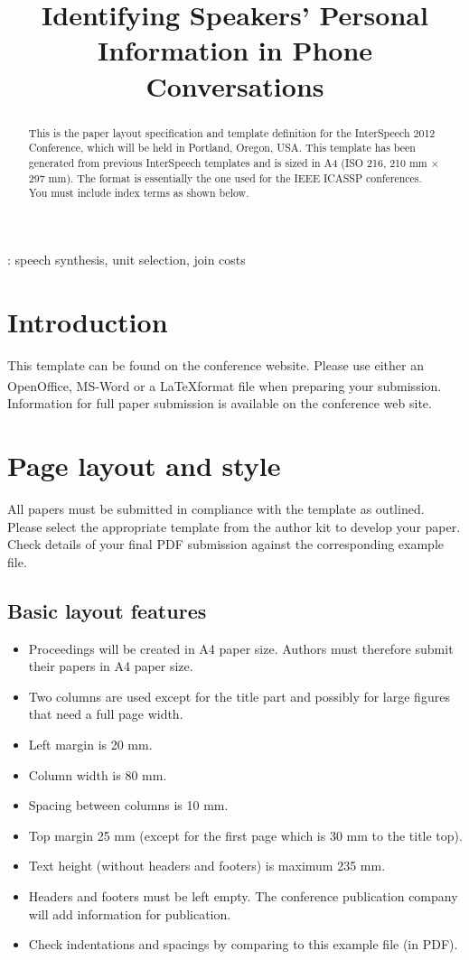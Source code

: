 \documentclass[a4paper]{article}
\title{Identifying Speakers' Personal Information in Phone Conversations}
\begin{document}
\maketitle


\begin{abstract}
This is the paper layout specification and template definition for the InterSpeech 2012 Conference, which will be held in Portland, Oregon, USA.
This template has been generated from previous InterSpeech templates and is sized in A4 (ISO 216, 210 mm $\times$ 297 mm).
The format is essentially the one used for the IEEE ICASSP conferences.
You must include index terms as shown below.
\end{abstract}
: speech synthesis, unit selection, join costs


\section{Introduction}
This template can be found on the conference website.
Please use either an OpenOffice, MS-Word\textsuperscript{\textregistered} or a \LaTeX format file when preparing your submission.
Information for full paper submission is available on the conference web site.


\section{Page layout and style}
All papers must be submitted in compliance with the template as outlined.
Please select the appropriate template from the author kit to develop your paper.
Check details of your final PDF submission against the corresponding example file.


\subsection{Basic layout features}
\begin{itemize}
\item Proceedings will be created in A4 paper size.
Authors must therefore submit their papers in A4 paper size.
\item Two columns are used except for the title part and possibly for large 
figures that need a full page width.
\item Left margin is 20 mm.
\item Column width is 80 mm.
\item Spacing between columns is 10 mm.
\item Top margin 25 mm (except for the first page which is 30 mm to the title top).
\item Text height (without headers and footers) is maximum 235 mm.
\item Headers and footers must be left empty.
The conference publication company will add information for publication.
\item Check indentations and spacings by comparing to this 
example file (in PDF).
\end{itemize}
\end{document}
